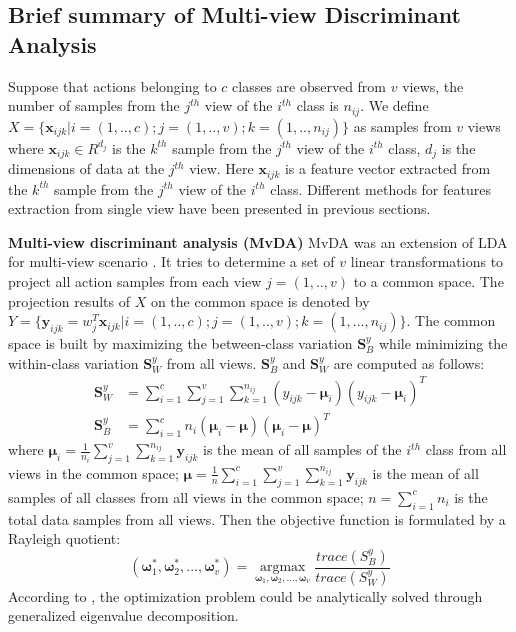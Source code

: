 
\subsection{Brief summary of Multi-view Discriminant Analysis}
    Suppose that actions belonging to $c$ classes are observed from $v$ views, the number of samples from the $j^{th}$ view of the $i^{th}$ class is $n_{ij}$. We define $X = \{\boldsymbol{x}_{ijk}|i=(1,..,c);j = (1,..,v);k=(1,..,n_{ij})\}$ as samples from $v$ views where 
    $\boldsymbol{x}_{ijk} \in R^{d_j}$ is the $k^{th}$ sample from the $j^{th}$ view of the $i^{th}$ class, $d_j$ is the dimensions of data at the $j^{th}$ view. Here ${\boldsymbol x}_{ijk}$ is a feature vector extracted from the $k^{th}$ sample from the $j^{th}$ view of the $i^{th}$ class. Different methods for features extraction from single view have been presented in previous sections. 

    \textbf{Multi-view discriminant analysis (MvDA)}
    MvDA was an extension of LDA for multi-view scenario \cite{kan2015multi}. It tries to determine a set of $v$ linear transformations to project all action samples from each view $j = (1,..,v)$ to a common space. The projection results of $X$ on the common space is denoted by $Y = \{\boldsymbol{y}_{ijk} = w_j^T\boldsymbol{x}_{ijk}|i=(1,..,c); j=(1,..,v); k=(1,...,n_{ij})\}$. The common space is built by maximizing the between-class variation $\boldsymbol{S}_B^y$ while minimizing the within-class variation $\boldsymbol{S}_W^y$ from all views. $\boldsymbol{S}_B^y$ and $\boldsymbol{S}_W^y$ are computed as follows: 
    \begin{align}
        \boldsymbol{S}_W^y &= \sum_{i=1}^{c}\sum_{j=1}^{v}\sum_{k=1}^{n_{ij}}(y_{ijk}-\boldsymbol{\mu}_i)(y_{ijk}-\boldsymbol{\mu}_i)^T \label{eq:MvDA_Sw}\\
        \boldsymbol{S}_B^y &= \sum_{i=1}^{c}n_i(\boldsymbol{\mu}_i - \boldsymbol{\mu})(\boldsymbol{\mu}_i - \boldsymbol{\mu})^T \label{eq:MvDA_Sb}
    \end{align}
    where $\boldsymbol{\mu}_i=\frac{1}{n_i}\sum_{j=1}^{v}{\sum_{k=1}^{n_{ij}}}{\boldsymbol{y}_{ijk}}$ is the mean of all samples of the $i^{th}$ class from all views in the common space; $\boldsymbol{\mu}=\frac{1}{n}\sum_{i=1}^{c}\sum_{j=1}^{v}{\sum_{k=1}^{n_{ij}}{\boldsymbol{y}_{ijk}}}$ is the mean of all samples of all classes from all views in the common space; $n=\sum_{i=1}^{c}n_i$ is the total data samples from all views.
    Then the objective function is formulated by a Rayleigh quotient:
    \begin{equation}
        (\boldsymbol{\omega}_1^*,\boldsymbol{\omega}_2^*, ..., \boldsymbol{\omega}_v^*) = \operatorname*{argmax}_{\boldsymbol{\omega}_1, \boldsymbol{\omega}_2,..., \boldsymbol{\omega}_v}\frac{trace({S}_B^y)}{trace({S}_W^y)}
        \label{eq:MvDA}
    \end{equation}
    According to \cite{kan2016multi}, the optimization problem could be analytically solved through generalized eigenvalue decomposition. 

